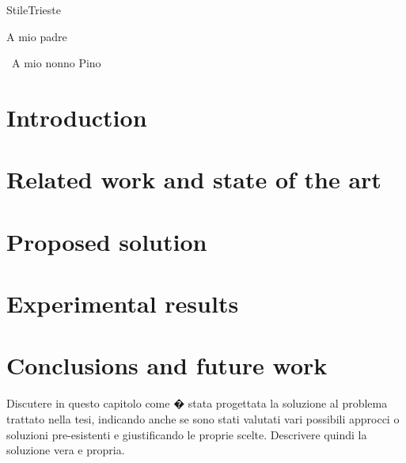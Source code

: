 \documentclass[pdfa%
,cucitura%
]{toptesi}
\begin{document}

\expandafter\ifx\csname StileTrieste\endcsname\relax
    \frontespizio
\else
    \paginavuota
    \begin{dedica}
        A mio padre

        \textdagger\ A mio nonno Pino
    \end{dedica}
    \tomo
\fi








\indici

\mainmatter

\chapter{Introduction}
%


\chapter{Related work and state of the art}


\chapter{Proposed solution}


\chapter{Experimental results}


\chapter{Conclusions and future work}





\iffalse

Discutere in questo capitolo come � stata progettata la soluzione al problema trattato nella tesi, indicando anche se sono stati valutati vari possibili approcci o soluzioni pre-esistenti e giustificando le proprie scelte. Descrivere quindi la soluzione vera e propria.
\end{document}
